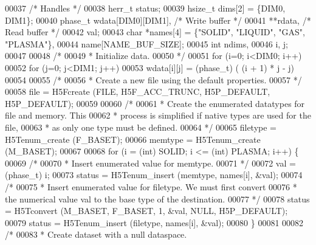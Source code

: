 \begin{DoxyCode}
00037                                             \textcolor{comment}{/* Handles */}
00038     herr\_t      status;
00039     hsize\_t     dims[2] = \{DIM0, DIM1\};
00040     phase\_t     wdata[DIM0][DIM1],          \textcolor{comment}{/* Write buffer */}
00041                 **rdata,                    \textcolor{comment}{/* Read buffer */}
00042                 val;
00043     \textcolor{keywordtype}{char}        *names[4] = \{\textcolor{stringliteral}{"SOLID"}, \textcolor{stringliteral}{"LIQUID"}, \textcolor{stringliteral}{"GAS"}, \textcolor{stringliteral}{"PLASMA"}\},
00044                 name[NAME\_BUF\_SIZE];
00045     \textcolor{keywordtype}{int}         ndims,
00046                 i, j;
00047 
00048     \textcolor{comment}{/*}
00049 \textcolor{comment}{     * Initialize data.}
00050 \textcolor{comment}{     */}
00051     \textcolor{keywordflow}{for} (i=0; i<DIM0; i++)
00052         \textcolor{keywordflow}{for} (j=0; j<DIM1; j++)
00053             wdata[i][j] = (phase\_t) ( (i + 1) * j - j) %
00054 
00055     \textcolor{comment}{/*}
00056 \textcolor{comment}{     * Create a new file using the default properties.}
00057 \textcolor{comment}{     */}
00058     file = H5Fcreate (FILE, H5F\_ACC\_TRUNC, H5P\_DEFAULT, H5P\_DEFAULT);
00059 
00060     \textcolor{comment}{/*}
00061 \textcolor{comment}{     * Create the enumerated datatypes for file and memory.  This}
00062 \textcolor{comment}{     * process is simplified if native types are used for the file,}
00063 \textcolor{comment}{     * as only one type must be defined.}
00064 \textcolor{comment}{     */}
00065     filetype = H5Tenum\_create (F\_BASET);
00066     memtype = H5Tenum\_create (M\_BASET);
00067 
00068     \textcolor{keywordflow}{for} (i = (\textcolor{keywordtype}{int}) SOLID; i <= (int) PLASMA; i++) \{
00069         \textcolor{comment}{/*}
00070 \textcolor{comment}{         * Insert enumerated value for memtype.}
00071 \textcolor{comment}{         */}
00072         val = (phase\_t) i;
00073         status = H5Tenum\_insert (memtype, names[i], &val);
00074         \textcolor{comment}{/*}
00075 \textcolor{comment}{         * Insert enumerated value for filetype.  We must first convert}
00076 \textcolor{comment}{         * the numerical value val to the base type of the destination.}
00077 \textcolor{comment}{         */}
00078         status = H5Tconvert (M\_BASET, F\_BASET, 1, &val, NULL, H5P\_DEFAULT);
00079         status = H5Tenum\_insert (filetype, names[i], &val);
00080     \}
00081 
00082     \textcolor{comment}{/*}
00083 \textcolor{comment}{     * Create dataset with a null dataspace.}

\end{DoxyCode}

